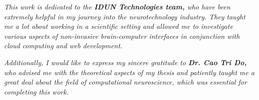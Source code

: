 \begin{dedication}

    \textit{This work is dedicated to the \textbf{IDUN Technologies team,} who have been extremely helpful in my journey into the neurotechnology industry. They taught me a lot about working in a scientific setting and allowed me to investigate various aspects of non-invasive brain-computer interfaces in conjunction with cloud computing and web development.}

    \hfill \break

    \textit{Additionally, I would like to express my sincere gratitude to \textbf{Dr. Cao Tri Do,} who advised me with the theoretical aspects of my thesis and patiently taught me a great deal about the field of computational neuroscience, which was essential for completing this work.}

\end{dedication}
